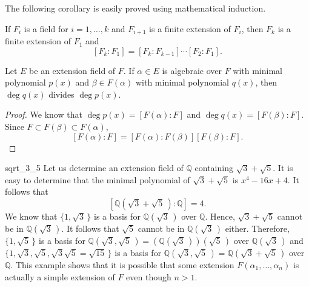 \medskip
 

The following corollary is easily proved using mathematical induction. 
 

\begin{corollary}
If $F_i$ is a field for $i = 1, \dots, k$ and $F_{i+1}$ is a finite
extension of $F_i$, then $F_k$ is a finite extension of $F_1$ and 
\[ 
[F_k : F_1] = [F_k : F_{k-1} ] \cdots [F_2 : F_1 ].
\]
\end{corollary}
 
 
\begin{corollary}
Let $E$ be an extension field of $F$. If $\alpha \in E$ is algebraic over
$F$ with minimal polynomial $p(x)$ and $\beta \in F( \alpha )$ with
minimal polynomial $q(x)$, then $\deg q(x)$ divides $\deg p(x)$. 
\end{corollary}
 

\begin{proof}
We know that $\deg p(x) = [F( \alpha ) : F ]$ and $\deg q(x) = [F(
\beta ) : F ]$. Since $F \subset F( \beta ) \subset F( \alpha )$,
\[
[F( \alpha ) : F ]=
[ F( \alpha ) : F( \beta ) ] [ F( \beta ) : F ].
\]
\end{proof}
 

\begin{example}{sqrt_3_5}
Let us determine an extension field of ${\mathbb Q}$ containing $\sqrt{3}
+ \sqrt{5}$. It is easy to determine that the minimal  polynomial of
$\sqrt{3} + \sqrt{5}$ is $x^4 - 16 x + 4$. It follows that
\[
[ {\mathbb Q}( \sqrt{3} + \sqrt{5}\, ) : {\mathbb Q} ] = 4.
\]
We know that $\{ 1, \sqrt{3}\, \}$ is a basis for  ${\mathbb Q}( \sqrt{3}\,
)$ over ${\mathbb Q}$. Hence, $\sqrt{3} + \sqrt{5}$ cannot be in ${\mathbb
Q}( \sqrt{3}\, )$. It follows that $\sqrt{5}$ cannot be in ${\mathbb Q}(
\sqrt{3}\, )$ either. Therefore, $\{ 1, \sqrt{5}\, \}$ is a basis for
${\mathbb Q}( \sqrt{3}, \sqrt{5}\, ) = ( {\mathbb Q}(\sqrt{3}\, ))( \sqrt{5}\, )$
over ${\mathbb Q}( \sqrt{3}\, )$ and $\{ 1, \sqrt{3}, \sqrt{5}, \sqrt{3}
\sqrt{5} = \sqrt{15}\,  \}$ is a basis for ${\mathbb Q}( \sqrt{3},
\sqrt{5}\, ) = {\mathbb Q}( \sqrt{3} + \sqrt{5}\, )$ over ${\mathbb Q}$. 
This example shows that it is possible
that some extension $F( \alpha_1, \ldots, \alpha_n )$ is actually a
simple extension of $F$ even though $n > 1$. 
\end{example}
 

